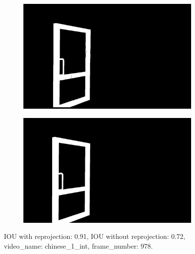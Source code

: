\begin{figure}
\begin{subfigure}[t]{0.19\textwidth}
\end{subfigure}
\begin{subfigure}[t]{0.19\textwidth}
\centering
\includegraphics[scale=0.07]{good_examples/visual_74577_w_np.png}
\end{subfigure}
\begin{subfigure}[t]{0.19\textwidth}
\centering
\includegraphics[scale=0.07]{good_examples/visual_74577_wo_np.png}
\end{subfigure}
\caption{IOU with reprojection: 0.91, IOU without reprojection: 0.72, video\_name: chinese\_1\_int, frame\_number: 978.}
\end{figure}

